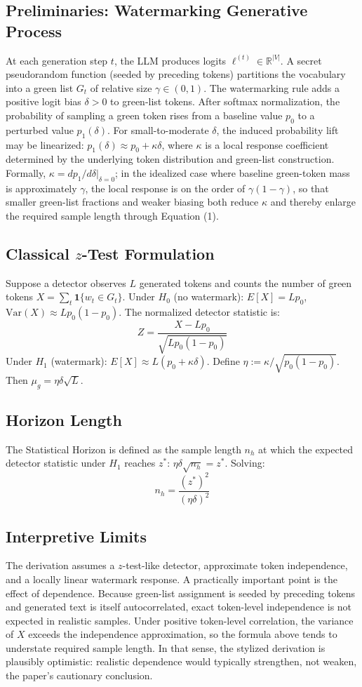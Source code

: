 \documentclass[11pt]{article}
\begin{document}
\subsection{Preliminaries: Watermarking Generative Process}
At each generation step $t$, the LLM produces logits $\ell^{(t)} \in
\mathbb{R}^{|V|}$. A secret pseudorandom function (seeded by preceding tokens)
partitions the vocabulary into a green list $G_t$ of relative size $\gamma \in
(0,1)$. The watermarking rule adds a positive logit bias $\delta > 0$ to green-list
tokens. After softmax normalization, the probability of sampling a green token rises
from a baseline value $p_0$ to a perturbed value $p_1(\delta)$. For
small-to-moderate $\delta$, the induced probability lift may be linearized:
$p_1(\delta) \approx p_0 + \kappa\delta$, where $\kappa$ is a local response
coefficient determined by the underlying token distribution and green-list
construction. Formally, $\kappa = dp_1/d\delta|_{\delta=0}$; in the idealized case
where baseline green-token mass is approximately $\gamma$, the local response is on
the order of $\gamma(1-\gamma)$, so that smaller green-list fractions and weaker
biasing both reduce $\kappa$ and thereby enlarge the required sample length through
Equation (1).
\subsection{Classical $z$-Test Formulation}
Suppose a detector observes $L$ generated tokens and counts the number of green
tokens $X = \sum_t \mathbf{1}\{w_t \in G_t\}$. Under $H_0$ (no watermark):
$E[X] = Lp_0$, $\mathrm{Var}(X) \approx Lp_0(1-p_0)$. The normalized detector
statistic is:
\begin{equation}
Z = \frac{X - Lp_0}{\sqrt{Lp_0(1-p_0)}}
\end{equation}
Under $H_1$ (watermark): $E[X] \approx L(p_0 + \kappa\delta)$. Define $\eta :=
\kappa/\sqrt{p_0(1-p_0)}$. Then $\mu_g = \eta\delta\sqrt{L}$.
\subsection{Horizon Length}
The Statistical Horizon is defined as the sample length $n_h$ at which the expected
detector statistic under $H_1$ reaches $z^*$: $\eta\delta\sqrt{n_h} = z^*$. Solving:
\begin{equation}
n_h = \frac{(z^*)^2}{(\eta\delta)^2}
\end{equation}
\subsection{Interpretive Limits}
The derivation assumes a $z$-test-like detector, approximate token independence, and
a locally linear watermark response. A practically important point is the effect of
dependence. Because green-list assignment is seeded by preceding tokens and generated
text is itself autocorrelated, exact token-level independence is not expected in
realistic samples. Under positive token-level correlation, the variance of $X$
exceeds the independence approximation, so the formula above tends to understate
required sample length. In that sense, the stylized derivation is plausibly
optimistic: realistic dependence would typically strengthen, not weaken, the paper's
cautionary conclusion.
\end{document}

